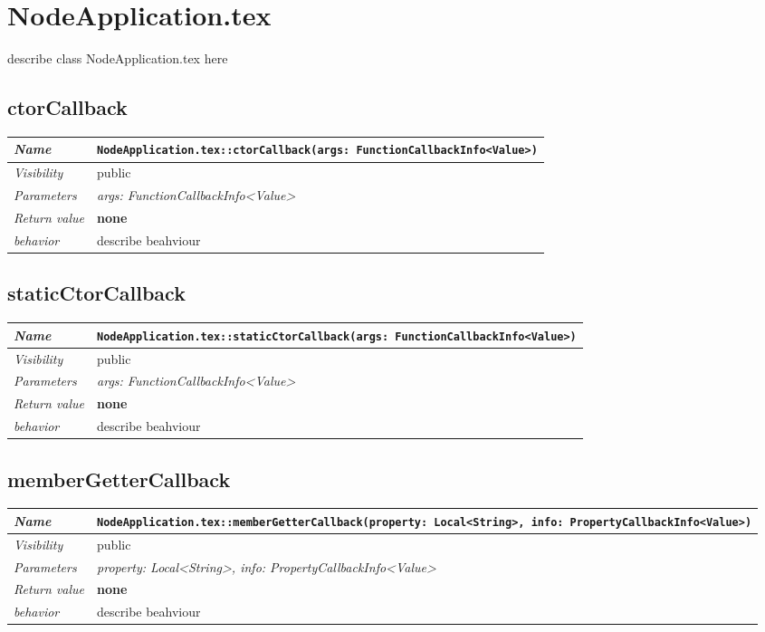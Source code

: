 \chapter{NodeApplication.tex}
describe class NodeApplication.tex here
\section{ctorCallback}
\begin{longtable}{p{3cm} @{\hskip 1cm} p{12cm}}
 \hline
\textit{Name} & \texttt{NodeApplication.tex::ctorCallback(args: FunctionCallbackInfo<Value>)}\\
\hline
 \textit{Visibility} & public\\
\hline
\textit{Parameters} & \textit{args: FunctionCallbackInfo<Value>}\\
\hline
\textit{Return value} & \textbf{none}\\
  \hline
 \textit{behavior} & describe beahviour \\
\hline
\end{longtable} \pagebreak
 \section{staticCtorCallback}
\begin{longtable}{p{3cm} @{\hskip 1cm} p{12cm}}
 \hline
\textit{Name} & \texttt{NodeApplication.tex::staticCtorCallback(args: FunctionCallbackInfo<Value>)}\\
\hline
 \textit{Visibility} & public\\
\hline
\textit{Parameters} & \textit{args: FunctionCallbackInfo<Value>}\\
\hline
\textit{Return value} & \textbf{none}\\
  \hline
 \textit{behavior} & describe beahviour \\
\hline
\end{longtable} \pagebreak
 \section{memberGetterCallback}
\begin{longtable}{p{3cm} @{\hskip 1cm} p{12cm}}
 \hline
\textit{Name} & \texttt{NodeApplication.tex::memberGetterCallback(property: Local<String>, info: PropertyCallbackInfo<Value>)}\\
\hline
 \textit{Visibility} & public\\
\hline
\textit{Parameters} & \textit{property: Local<String>, info: PropertyCallbackInfo<Value>}\\
\hline
\textit{Return value} & \textbf{none}\\
  \hline
 \textit{behavior} & describe beahviour \\
\hline
\end{longtable} \pagebreak

